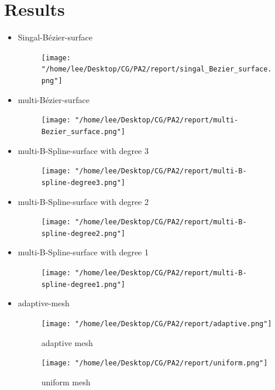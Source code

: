 \documentclass[acmtog]{acmart}
\begin{document}
\section{Results}
\begin{itemize}
	\item Singal-Bézier-surface
	\begin{figure}[H]
		\centering
		\texttt{[image: "/home/lee/Desktop/CG/PA2/report/singal\_Bezier\_surface.png"]}
	\end{figure}
	\item multi-Bézier-surface
	\begin{figure}[H]
		\centering
		\texttt{[image: "/home/lee/Desktop/CG/PA2/report/multi-Bezier\_surface.png"]}
	\end{figure}
	\item multi-B-Spline-surface with degree 3
	\begin{figure}[H]
		\centering
		\texttt{[image: "/home/lee/Desktop/CG/PA2/report/multi-B-spline-degree3.png"]}
	\end{figure}
	\item multi-B-Spline-surface with degree 2
	\begin{figure}[H]
		\centering
		\texttt{[image: "/home/lee/Desktop/CG/PA2/report/multi-B-spline-degree2.png"]}
	\end{figure}
	\item multi-B-Spline-surface with degree 1
	\begin{figure}[H]
		\centering
		\texttt{[image: "/home/lee/Desktop/CG/PA2/report/multi-B-spline-degree1.png"]}
	\end{figure}
	\item adaptive-mesh
	\begin{figure}[H]
		\texttt{[image: "/home/lee/Desktop/CG/PA2/report/adaptive.png"]}
		\caption{adaptive mesh}
		\texttt{[image: "/home/lee/Desktop/CG/PA2/report/uniform.png"]}
		\caption{uniform mesh}
	\end{figure}
\end{itemize}
\end{document}
